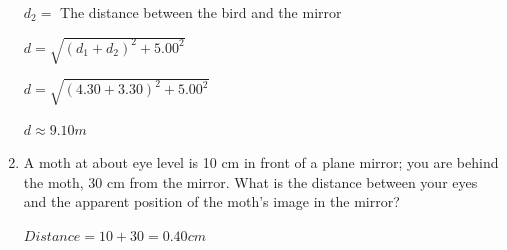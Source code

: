 \documentclass[fleqn]{article}
\begin{document}
\begin{enumerate}
    \textcolor{hwColor}{
      $d_2=$ The distance between the bird and the mirror
    }

    \textcolor{hwColor}{
      $
        d=\sqrt{(d_1+d_2)^2+5.00^2}
      $
    }

    \textcolor{hwColor}{
      $
        d=\sqrt{(4.30+3.30)^2+5.00^2}
      $
    }

    \textcolor{hwColor}{
      $
        d\approx 9.10 m
      $
    }

    \bigbreak

    \item A moth at about eye level is 10 cm in front of a plane mirror; you are behind the moth, 30 cm from the mirror. What is the distance between your eyes and the apparent position of the moth’s image in the mirror?
    
    \textcolor{hwColor}{
      $
        Distance=10+30= 0.40 cm
      $
    }
  \end{enumerate}
\end{document}
